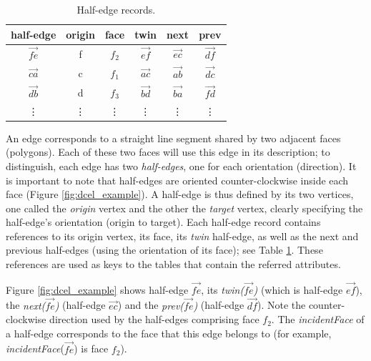 \begin{table} 
\begin{minipage}{\textwidth}
    \small
    \centering
    \caption{Half-edge records.}\label{tab:hedges}
    \begin{tabular}{c c c c c c} 
        \toprule
        half-edge & origin & face & twin & next & prev \\
        \midrule
        $\vec{fe}$ & f & $f_2$  & $\vec{ef}$ & $\vec{ec}$ & $\vec{df}$ \\
        $\vec{ca}$ & c & $f_1$  & $\vec{ac}$ & $\vec{ab}$ & $\vec{dc}$ \\
        $\vec{db}$ & d & $f_3$  & $\vec{bd}$ & $\vec{ba}$ & $\vec{fd}$ \\
        \vdots     & \vdots & \vdots & \vdots     & \vdots     & \vdots     \\
        \bottomrule
    \end{tabular}
\end{minipage}
\end{table}

An edge corresponds to a straight line segment shared by two adjacent faces (polygons). Each of these two faces will use this edge in its description; to distinguish, each edge has two \textit{half-edges}, one for each orientation (direction). It is important to note that half-edges are oriented counter-clockwise inside each face (Figure \ref{fig:dcel_example}). A half-edge is thus defined by its two vertices, one called the \textit{origin} vertex and the other the \textit{target} vertex, clearly specifying the half-edge's orientation (origin to target). Each half-edge record contains references to its origin vertex, its face, its \textit{twin} half-edge, as well as the next and previous half-edges (using the orientation of its face); see Table \ref{tab:hedges}. These references are used as keys to the tables that contain the referred attributes. 

Figure \ref{fig:dcel_example} shows half-edge $\overrightarrow{fe}$, its \textit{twin($\overrightarrow{fe}$)} (which is half-edge $\overrightarrow{ef}$), the \textit{next($\overrightarrow{fe}$)} (half-edge $\overrightarrow{ec}$) and the \textit{prev($\overrightarrow{fe}$)} (half-edge $\overrightarrow{df}$). Note the counter-clockwise direction used by the half-edges comprising face $f_2$. The \textit{incidentFace} of a half-edge corresponds to the face that this edge belongs to (for example, \textit{incidentFace}($\overrightarrow{fe}$) is face $f_2$).


